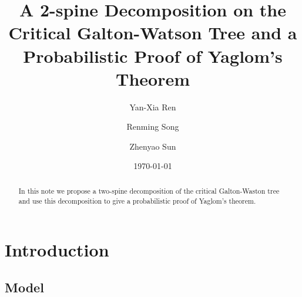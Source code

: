 \documentclass[12pt]{amsart}
\title[A 2-spine decomposition and Yaglom's theorem]{A 2-spine Decomposition on the Critical Galton-Watson Tree and a Probabilistic Proof of Yaglom's Theorem}
\author{Yan-Xia Ren}
\author{Renming Song}
\author{Zhenyao Sun}
\date{\today}
\theoremstyle{remark}
\numberwithin{equation}{section}
\begin{document}
\begin{abstract}
In this note  we propose a two-spine decomposition of the critical Galton-Waston tree
and use this decomposition to give a probabilistic proof of Yaglom's theorem.
\end{abstract}
	\maketitle	
\section{Introduction}
\subsection{Model}
\label{sec:model}
\end{document}
